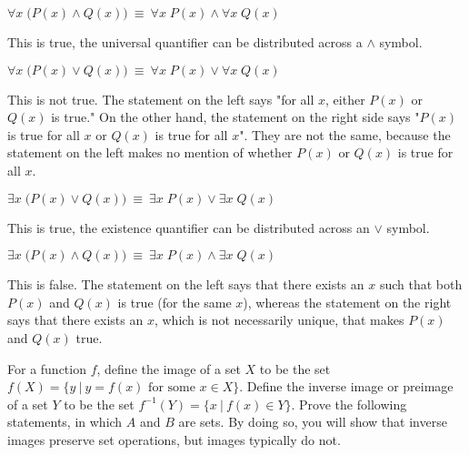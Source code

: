 \documentclass[11pt]{article}
\begin{document}
\begin{Parts}
    \Part $\forall x \; \bigl( P(x) \wedge Q(x) \bigr)~\equiv~\forall x \; P(x) \wedge \forall x \; Q(x)$

    \begin{solution}
        This is true, the universal quantifier can be distributed across a $\land$ symbol.
    \end{solution}  
    
    
    \Part $\forall x \; \bigl( P(x) \vee Q(x) \bigr)~\equiv~\forall x \; P(x) \vee \forall x \; Q(x)$

    \begin{solution}
        This is not true. The statement on the left says "for all $x$, either $P(x)$ or $Q(x)$ is true." On the other hand, the statement on the right side says "$P(x)$ is true for all $x$ or $Q(x)$ is true for all $x$". They are not the same, because the statement on the left makes no mention of whether $P(x)$ or $Q(x)$ is true for all $x$.
    \end{solution}
    
    \Part $\exists x \; \bigl( P(x) \vee Q(x) \bigr)~\equiv~\exists x \; P(x) \vee \exists x \; Q(x)$

    \begin{solution}
        This is true, the existence quantifier can be distributed across an $\lor$ symbol.
    \end{solution}
    
    \Part $\exists x \; \bigl( P(x) \wedge Q(x) \bigr)~\equiv~\exists x \; P(x) \wedge \exists x \; Q(x)$

    \begin{solution}
        This is false. The statement on the left says that there exists an $x$ such that both $P(x)$ and $Q(x)$ is true (for the same $x$), whereas the statement on the right says that there exists an $x$, which is not necessarily unique, that makes $P(x)$ and $Q(x)$ true.
    \end{solution}
    
\end{Parts}


For a function $f$, define the image of a set $X$ to be the set $f(X) = \{y~|~y = f(x) \text{ for some } x \in X\}$. Define the inverse image or preimage of a set $Y$ to be the set $f^{-1}(Y) = \{x~|~f(x) \in Y\}$. Prove the following statements, in which $A$ and $B$ are sets. By doing so, you will show that inverse images preserve set operations, but images typically do not.
\end{document}
